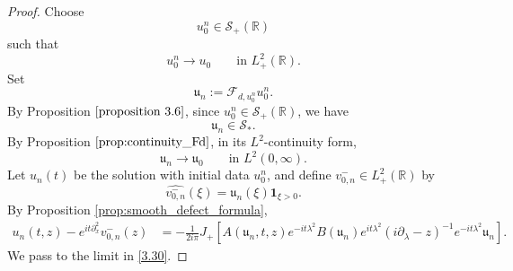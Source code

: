 \documentclass[10pt]{article}
\numberwithin{equation}{section}
\numberwithin{theorem}{section}
\begin{document}
\begin{proof}
Choose
\[
u_0^n\in\mathcal S_+(\mathbb R)
\]
such that
\[
u_0^n\to u_0
\qquad\text{in }L^2_+(\mathbb R).
\]
Set
\[
\mathfrak u_n:=\mathcal F_{d,u_0^n}u_0^n.
\]
By Proposition \(\ref{proposition 3.6}\), since \(u_0^n\in\mathcal S_+(\mathbb R)\),
we have
\[
\mathfrak u_n\in\mathcal S_*.
\]
By Proposition \(\ref{prop:continuity_Fd}\), in its \(L^2\)-continuity form,
\begin{equation}
\label{3.29}
\mathfrak u_n\to\mathfrak u_0
\qquad\text{in }L^2(0,\infty).
\end{equation}
Let \(u_n(t)\) be the solution with initial data \(u_0^n\), and define
\(v_{0,n}^-\in L^2_+(\mathbb R)\) by
\[
\widehat{v_{0,n}^-}(\xi)=\mathfrak u_n(\xi)\mathbf 1_{\xi>0}.
\]
By Proposition \ref{prop:smooth_defect_formula},
\begin{equation}
\label{3.30}
\begin{aligned}
u_n(t,z)-e^{it\partial_x^2}v_{0,n}^-(z)
&=
-\frac1{2i\pi}
J_+\left[
A(\mathfrak u_n,t,z)
e^{-it\lambda^2}
B(\mathfrak u_n)
e^{it\lambda^2}
(i\partial_\lambda-z)^{-1}
e^{-it\lambda^2}\mathfrak u_n
\right].
\end{aligned}
\end{equation}
We pass to the limit in \eqref{3.30}.


\end{proof}
\end{document}

